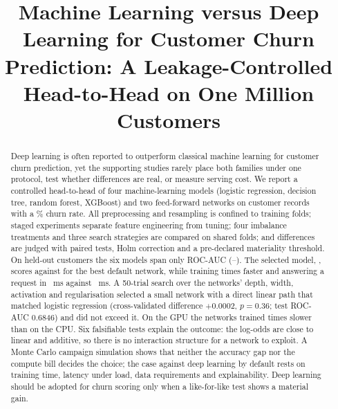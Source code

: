 \documentclass[conference]{IEEEtran}
\begin{document}
\title{Machine Learning versus Deep Learning for Customer Churn Prediction: A Leakage-Controlled Head-to-Head on One Million Customers}

\author{
}

\maketitle

\begin{abstract}
Deep learning is often reported to outperform classical machine learning for customer churn prediction, yet the supporting studies rarely place both families under one protocol, test whether differences are real, or measure serving cost. We report a controlled head-to-head of four machine-learning models (logistic regression, decision tree, random forest, XGBoost) and two feed-forward networks on \NRows{} customer records with a \ChurnRatePct\% churn rate. All preprocessing and resampling is confined to training folds; staged experiments separate feature engineering from tuning; four imbalance treatments and three search strategies are compared on shared folds; and differences are judged with paired tests, Holm correction and a pre-declared materiality threshold. On \NTest{} held-out customers the six models span only \TestSpread{} ROC-AUC (\TestAucMin{}--\TestAucMax{}). The selected model, \ChampionLong{}, scores \ChampAucTest{} against \BestDlAucTest{} for the best default network, while training \TrainRatioBestDl{} times faster and answering a request in \ChampOnlineMs{}~ms against \BestDlOnlineMs{}~ms. A 50-trial search over the networks' depth, width, activation and regularisation selected a small network with a direct linear path that matched logistic regression (cross-validated difference $+0.0002$, $p=0.36$; test ROC-AUC 0.6846) and did not exceed it. On the GPU the networks trained \GpuSlowdownDnn{} times slower than on the CPU. Six falsifiable tests explain the outcome: the log-odds are close to linear and additive, so there is no interaction structure for a network to exploit. A Monte Carlo campaign simulation shows that neither the accuracy gap nor the compute bill decides the choice; the case against deep learning by default rests on training time, latency under load, data requirements and explainability. Deep learning should be adopted for churn scoring only when a like-for-like test shows a material gain.
\end{abstract}
\end{document}
